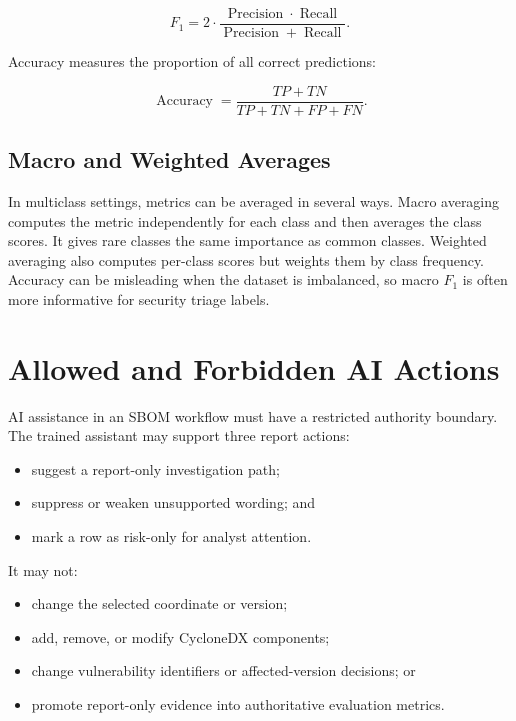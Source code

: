 \begin{equation}
\label{eq:pfe-ai-f1}
F_1 = 2 \cdot \frac{\operatorname{Precision}\cdot\operatorname{Recall}}
{\operatorname{Precision}+\operatorname{Recall}}.
\end{equation}

Accuracy measures the proportion of all correct predictions:

\begin{equation}
\label{eq:pfe-ai-accuracy}
\operatorname{Accuracy}=\frac{TP+TN}{TP+TN+FP+FN}.
\end{equation}

\subsection{Macro and Weighted Averages}

In multiclass settings, metrics can be averaged in several ways. Macro
averaging computes the metric independently for each class and then averages
the class scores. It gives rare classes the same importance as common
classes. Weighted averaging also computes per-class scores but weights them
by class frequency. Accuracy can be misleading when the dataset is imbalanced,
so macro \(F_1\) is often more informative for security triage labels.

\section{Allowed and Forbidden AI Actions}

AI assistance in an SBOM workflow must have a restricted authority boundary.
The trained assistant may support three report actions:

\begin{itemize}
  \item suggest a report-only investigation path;
  \item suppress or weaken unsupported wording; and
  \item mark a row as risk-only for analyst attention.
\end{itemize}

It may not:

\begin{itemize}
  \item change the selected coordinate or version;
  \item add, remove, or modify CycloneDX components;
  \item change vulnerability identifiers or affected-version decisions; or
  \item promote report-only evidence into authoritative evaluation metrics.
\end{itemize}

